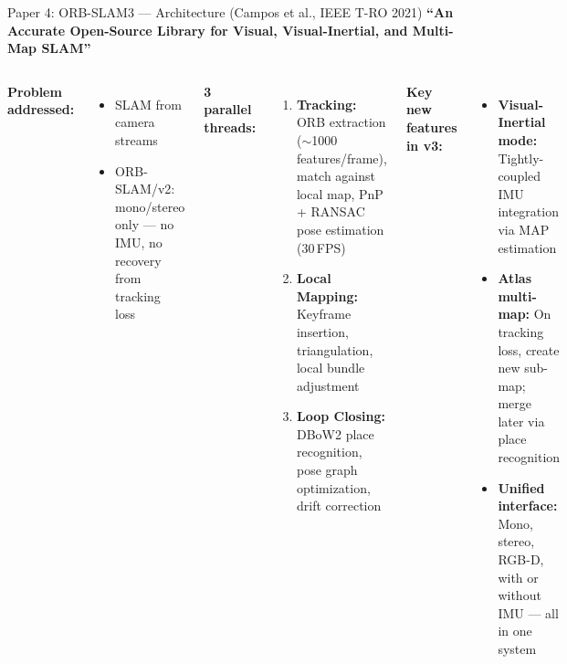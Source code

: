 \documentclass[aspectratio=169, 11pt]{beamer}
\begin{document}
\begin{frame}{Paper 4: ORB-SLAM3 --- Architecture (Campos et al., IEEE T-RO 2021)}
\small
\textbf{``An Accurate Open-Source Library for Visual, Visual-Inertial, and Multi-Map SLAM''}

\begin{columns}[T]
\textbf{Problem addressed:}
\begin{itemize}
    \item SLAM from camera streams
    \item ORB-SLAM/v2: mono/stereo only --- no IMU, no recovery from tracking loss
\end{itemize}

\vspace{0.3em}
\textbf{3 parallel threads:}
\begin{enumerate}
    \item \textbf{Tracking:} ORB extraction ($\sim$1000 features/frame), match against local map, PnP + RANSAC pose estimation (30\,FPS)
    \item \textbf{Local Mapping:} Keyframe insertion, triangulation, local bundle adjustment
    \item \textbf{Loop Closing:} DBoW2 place recognition, pose graph optimization, drift correction
\end{enumerate}

\textbf{Key new features in v3:}
\begin{itemize}
    \item \textbf{Visual-Inertial mode:} Tightly-coupled IMU integration via MAP estimation
    \item \textbf{Atlas multi-map:} On tracking loss, create new sub-map; merge later via place recognition
    \item \textbf{Unified interface:} Mono, stereo, RGB-D, with or without IMU --- all in one system
\end{itemize}
\end{columns}
\end{frame}
\end{document}
